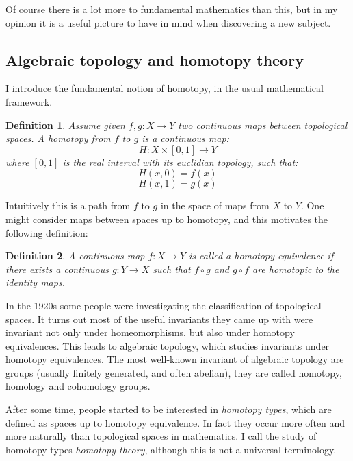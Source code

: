 \documentclass{article}
\newcommand{\sse}[1]{\medbreak \subsection{#1}}
\renewcommand{\r}{\rightarrow}
\newtheorem{definition}{Definition}
\begin{document}
Of course there is a lot more to fundamental mathematics than this, but in my opinion it is a useful picture to have in mind when discovering a new subject.


\sse{Algebraic topology and homotopy theory}

I introduce the fundamental notion of homotopy, in the usual mathematical framework.

\begin{definition}
Assume given $f,g:X\r Y$ two continuous maps between topological spaces. A homotopy from $f$ to $g$ is a continuous map:
\[H : X\times [0,1]\r Y\]
where $[0,1]$ is the real interval with its euclidian topology, such that:
\[H(x,0) = f(x)\]
\[H(x,1) = g(x)\]
\end{definition}

Intuitively this is a path from $f$ to $g$ in the space of maps from $X$ to $Y$. One might consider maps between spaces up to homotopy, and this motivates the following definition:

\begin{definition}
A continuous map $f:X\r Y$ is called a homotopy equivalence if there exists a continuous $g:Y\r X$ such that $f\circ g$ and $g\circ f$ are homotopic to the identity maps.
\end{definition}

In the 1920s some people were investigating the classification of topological spaces. It turns out most of the useful invariants they came up with were invariant not only under homeomorphisms, but also under homotopy equivalences. This leads to algebraic topology, which studies invariants under homotopy equivalences. The most well-known invariant of algebraic topology are groups (usually finitely generated, and often abelian), they are called homotopy, homology and cohomology groups.

After some time, people started to be interested in \emph{homotopy types}, which are defined as spaces up to homotopy equivalence. In fact they occur more often and more naturally than topological spaces in mathematics. %
 I call the study of homotopy types \emph{homotopy theory}, although this is not a universal terminology.
\end{document}
